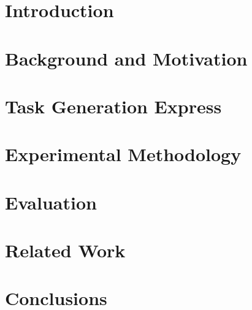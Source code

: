 \newcommand{\proposal}{TaskGenX}

\section{Introduction}
\label{sec:intro}



\section{Background and Motivation}
\label{sec:background}


\section{Task Generation Express}
\label{sec:ram}



\section{Experimental Methodology}
\label{sec:experimental}


\section{Evaluation}
\label{sec:evaluation}


\section{Related Work}
\label{sec:related}


\section{Conclusions}
\label{sec:conclusions}


